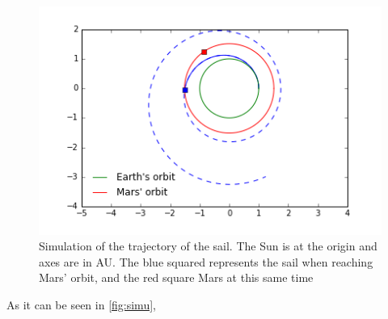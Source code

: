 \documentclass[twocolumn,12pt,a4paper]{article}
\numberwithin{equation}{section}
\begin{document}
\begin{figure}[h]
	\centering
	\includegraphics[scale=0.5]{simu.png}
	\caption{\small Simulation of the trajectory of the sail. The Sun is at the origin and axes are in AU. The blue squared represents the sail when reaching Mars' orbit, and the red square Mars at this same time}
	\label{fig:simu}
\end{figure}
 
As it can be seen in \autoref{fig:simu},  



\end{document}
